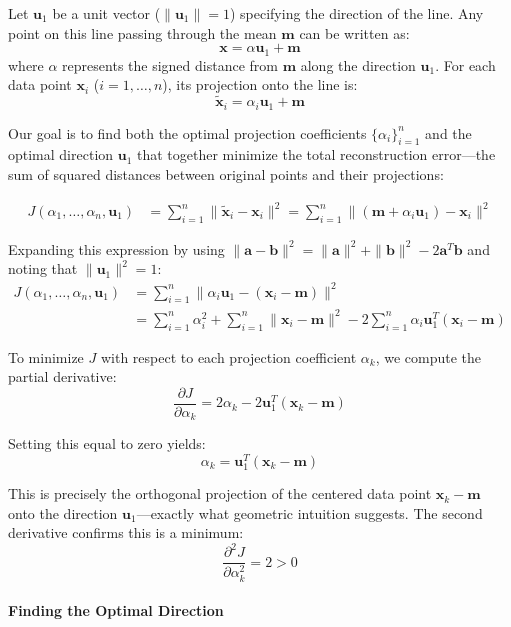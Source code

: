 Let $\mathbf{u}_{1}$ be a unit vector ($\|\mathbf{u}_{1}\|=1$) specifying the direction of the line. Any point on this line passing through the mean $\mathbf{m}$ can be written as:
$$
\mathbf{x}=\alpha\mathbf{u}_{1}+\mathbf{m}
$$
where $\alpha$ represents the signed distance from $\mathbf{m}$ along the direction $\mathbf{u}_{1}$. For each data point $\mathbf{x}_{i}$ ($i=1,\ldots, n$), its projection onto the line is:
$$
\tilde{\mathbf{x}}_{i}=\alpha_{i}\mathbf{u}_1+\mathbf{m}
$$

Our goal is to find both the optimal projection coefficients $\{\alpha_i\}_{i=1}^n$ and the optimal direction $\mathbf{u}_1$ that together minimize the total reconstruction error—the sum of squared distances between original points and their projections:

\begin{align*}
J(\alpha_{1},\ldots,\alpha_{n},\mathbf{u}_{1})&=\sum_{i=1}^{n}\|\tilde{\mathbf{x}}_{i}-\mathbf{x}_{i}\|^{2}=\sum_{i=1}^{n}\|(\mathbf{m}+\alpha_{i}\mathbf{u}_{1})-\mathbf{x}_{i}\|^{2}
\end{align*}

Expanding this expression by using $\|\mathbf{a} - \mathbf{b}\|^2 = \|\mathbf{a}\|^2 + \|\mathbf{b}\|^2 - 2\mathbf{a}^T\mathbf{b}$ and noting that $\|\mathbf{u}_1\|^2 = 1$:
\begin{align*}
J(\alpha_{1},\ldots,\alpha_{n},\mathbf{u}_{1})&=\sum_{i=1}^{n}\|\alpha_{i}\mathbf{u}_{1} - (\mathbf{x}_{i}-\mathbf{m})\|^{2}\\
&=\sum_{i=1}^{n}\alpha_{i}^{2}+\sum_{i=1}^{n}\|\mathbf{x}_{i}-\mathbf{m}\|^{2}-2\sum_{i=1}^{n}\alpha_{i}\mathbf{u}_{1}^{T}(\mathbf{x}_{i}-\mathbf{m})
\end{align*}

To minimize $J$ with respect to each projection coefficient $\alpha_k$, we compute the partial derivative:
$$
\frac{\partial J}{\partial \alpha_{k}}=2\alpha_{k}-2\mathbf{u}_{1}^{T}(\mathbf{x}_{k}-\mathbf{m})
$$

Setting this equal to zero yields:
$$
\alpha_{k}=\mathbf{u}_{1}^{T}(\mathbf{x}_{k}-\mathbf{m})
$$

This is precisely the \alert{orthogonal projection} of the centered data point $\mathbf{x}_k - \mathbf{m}$ onto the direction $\mathbf{u}_1$—exactly what geometric intuition suggests. The second derivative confirms this is a minimum:
$$
\frac{\partial^2 J}{\partial \alpha_{k}^{2}}=2 > 0
$$

\paragraph{Finding the Optimal Direction}

